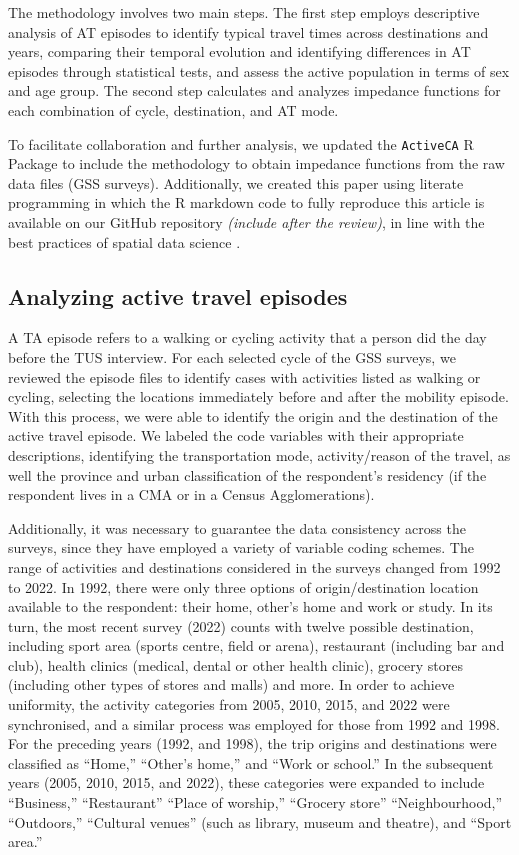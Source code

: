 \documentclass[preprint, 3p,
authoryear]{elsarticle} %
\begin{document}
The methodology involves two main steps. The first step employs
descriptive analysis of AT episodes to identify typical travel times
across destinations and years, comparing their temporal evolution and
identifying differences in AT episodes through statistical tests, and
assess the active population in terms of sex and age group. The second
step calculates and analyzes impedance functions for each combination of
cycle, destination, and AT mode.

To facilitate collaboration and further analysis, we updated the
\texttt{ActiveCA} R Package to include the methodology to obtain
impedance functions from the raw data files (GSS surveys). Additionally,
we created this paper using literate programming in which the R markdown
code to fully reproduce this article is available on our GitHub
repository \emph{(include after the review)}, in line with the best
practices of spatial data science \citep{arribas-bel2021, paez2021}.

\subsection{Analyzing active travel
episodes}\label{analyzing-active-travel-episodes}

A TA episode refers to a walking or cycling activity that a person did
the day before the TUS interview. For each selected cycle of the GSS
surveys, we reviewed the episode files to identify cases with activities
listed as walking or cycling, selecting the locations immediately before
and after the mobility episode. With this process, we were able to
identify the origin and the destination of the active travel episode. We
labeled the code variables with their appropriate descriptions,
identifying the transportation mode, activity/reason of the travel, as
well the province and urban classification of the respondent's residency
(if the respondent lives in a CMA or in a Census Agglomerations).

Additionally, it was necessary to guarantee the data consistency across
the surveys, since they have employed a variety of variable coding
schemes. The range of activities and destinations considered in the
surveys changed from 1992 to 2022. In 1992, there were only three
options of origin/destination location available to the respondent:
their home, other's home and work or study. In its turn, the most recent
survey (2022) counts with twelve possible destination, including sport
area (sports centre, field or arena), restaurant (including bar and
club), health clinics (medical, dental or other health clinic), grocery
stores (including other types of stores and malls) and more. In order to
achieve uniformity, the activity categories from 2005, 2010, 2015, and
2022 were synchronised, and a similar process was employed for those
from 1992 and 1998. For the preceding years (1992, and 1998), the trip
origins and destinations were classified as ``Home,'' ``Other's home,''
and ``Work or school.'' In the subsequent years (2005, 2010, 2015, and
2022), these categories were expanded to include ``Business,''
``Restaurant'' ``Place of worship,'' ``Grocery store''
``Neighbourhood,'' ``Outdoors,'' ``Cultural venues'' (such as library,
museum and theatre), and ``Sport area.''
\end{document}
